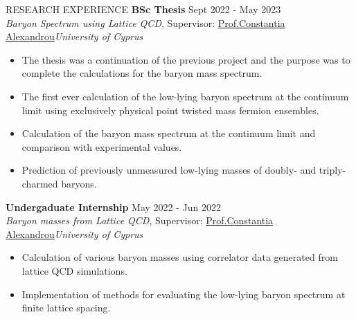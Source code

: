 \documentclass{resume} %
\begin{document}
\begin{rSection}{RESEARCH EXPERIENCE}
                \textbf{BSc Thesis} \hfill Sept 2022 - May 2023\\
                {\it Baryon Spectrum using Lattice QCD}, Supervisor:  \href{https://www.cyi.ac.cy/index.php/castorc/about-the-center/castorc-our-people/itemlist/user/99-constantia-alexandrou.html}{Prof.\@ Constantia Alexandrou}\hfill \textit{University of Cyprus}
                \begin{itemize}
                        \itemsep -3pt {} 
                        \item The thesis was a continuation of the previous project and the purpose was to complete the calculations for the baryon mass spectrum.
                        \item The first ever calculation of the low-lying baryon spectrum at the continuum limit using exclusively physical point twisted mass fermion ensembles.
                        \item Calculation of the baryon mass spectrum at the continuum limit and comparison with experimental values.
                        \item Prediction of previously unmeasured low-lying masses of doubly- and triply-charmed baryons.
                \end{itemize}

                \textbf{Undergaduate Internship} \hfill May 2022 - Jun 2022\\
                {\it Baryon masses from Lattice QCD}, Supervisor:  \href{https://www.cyi.ac.cy/index.php/castorc/about-the-center/castorc-our-people/itemlist/user/99-constantia-alexandrou.html}{Prof.\@ Constantia Alexandrou}\hfill \textit{University of Cyprus}
                \begin{itemize}
                        \itemsep -3pt {} 
                        \item Calculation of various baryon masses using correlator data generated from lattice QCD simulations.
                        \item Implementation of methods for evaluating the low-lying baryon spectrum at finite lattice spacing.
                \end{itemize}


\end{rSection}
\end{document}
